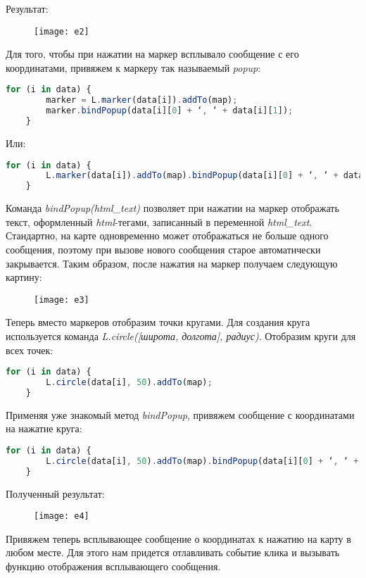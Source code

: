 Результат:
\begin{figure}[ht!]
    \center
    \texttt{[image: e2]}
\end{figure}

Для того, чтобы при нажатии на маркер всплывало сообщение с его координатами, 
привяжем к маркеру так называемый \emph{popup}:
\begin{lstlisting}[language=js]
    for (i in data) {
        marker = L.marker(data[i]).addTo(map);
        marker.bindPopup(data[i][0] + ‘, ‘ + data[i][1]);
    }
\end{lstlisting}
Или:
\begin{lstlisting}[language=js]
    for (i in data) {
        L.marker(data[i]).addTo(map).bindPopup(data[i][0] + ‘, ‘ + data[i][1]);
    }
\end{lstlisting}

Команда \emph{bindPopup(html\_text)} позволяет при нажатии на маркер отображать 
текст, оформленный \emph{html}-тегами, записанный в переменной 
\emph{html\_text}. Стандартно, на карте одновременно может отображаться не 
больше одного сообщения, поэтому при вызове нового сообщения старое 
автоматически закрывается. Таким образом, после нажатия на маркер получаем 
следующую картину: 
\begin{figure}[ht!]
    \center
    \texttt{[image: e3]}
\end{figure}

Теперь вместо маркеров отобразим точки кругами. Для создания круга 
используется команда \emph{L.circle([широта, долгота], радиус)}. Отобразим 
круги для всех точек:
\begin{lstlisting}[language=js]
    for (i in data) {
        L.circle(data[i], 50).addTo(map);
    }
\end{lstlisting}
Применяя уже знакомый метод \emph{bindPopup}, привяжем сообщение с 
координатами на нажатие круга:
\begin{lstlisting}[language=js]
    for (i in data) {
        L.circle(data[i], 50).addTo(map).bindPopup(data[i][0] + ‘, ‘ + data[i][1]);
    }
\end{lstlisting}

Полученный результат:
\begin{figure}[ht!]
    \center
    \texttt{[image: e4]}
\end{figure}

Привяжем теперь всплывающее сообщение о координатах к нажатию на карту в 
любом месте. Для этого нам придется отлавливать событие клика и вызывать 
функцию отображения всплывающего сообщения.

